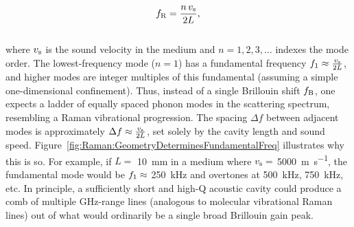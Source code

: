 \begin{equation}
  f_{\rm R} = \frac{n\,v_{\rm s}}{2L},
  \label{eq:Raman:f_R}
\end{equation}
\\
where \(v_{\rm s}\) is the sound velocity in the medium and \(n = 1, 2, 3, \dots\) indexes the mode order. The lowest-frequency mode (\(n = 1\)) has a fundamental frequency \(f_{\rm 1} \approx \frac{v_{\rm s}}{2L}\), and higher modes are integer multiples of this fundamental (assuming a simple one-dimensional confinement). Thus, instead of a single Brillouin shift \(f_{\rm B}\), one expects a ladder of equally spaced phonon modes in the scattering spectrum, resembling a Raman vibrational progression. The spacing \(\Delta f\) between adjacent modes is approximately \(\Delta f \approx \frac{v_{\rm s}}{2L}\), set solely by the cavity length and sound speed. Figure~\ref{fig:Raman:GeometryDeterminesFundamentalFreq} illustrates why this is so. For example, if \(L =\) \SI{10}{\milli\meter} in a medium where \(v_{\rm s} =\) \SI{5000}{\meter\per\second}, the fundamental mode would be \(f_{\rm 1} \approx\) \SI{250}{\kilo\hertz} and overtones at \SI{500}{\kilo\hertz}, \SI{750}{\kilo\hertz}, etc. In principle, a sufficiently short and high-Q acoustic cavity could produce a comb of multiple \si{\giga\hertz}-range lines (analogous to molecular vibrational Raman lines) out of what would ordinarily be a single broad Brillouin gain peak.

